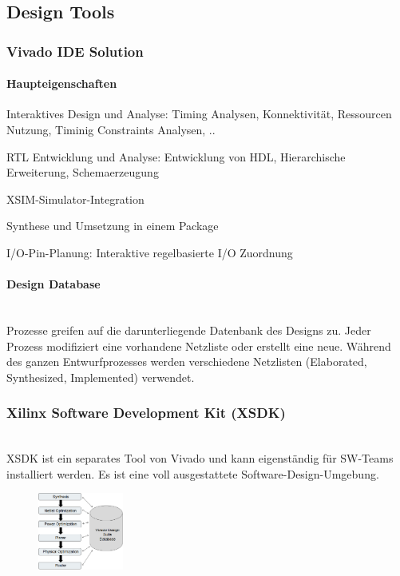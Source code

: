  \subsection{Design Tools}
 \subsubsection{Vivado IDE Solution}
 \paragraph{Haupteigenschaften}
 \begin{compactitem}
     \item Interaktives Design und Analyse: Timing Analysen, Konnektivität, Ressourcen Nutzung, Timinig Constraints Analysen, ..
     \item RTL Entwicklung und Analyse: Entwicklung von HDL, Hierarchische Erweiterung, Schemaerzeugung
     \item XSIM-Simulator-Integration
     \item Synthese und Umsetzung in einem Package
     \item I/O-Pin-Planung: Interaktive regelbasierte I/O Zuordnung
 \end{compactitem}
 \begin{multicols}{2}
     \paragraph{Design Database}$~$ \\
     Prozesse greifen auf die darunterliegende Datenbank des Designs zu. Jeder Prozess modifiziert eine vorhandene Netzliste oder erstellt eine neue. Während des ganzen Entwurfprozesses werden verschiedene Netzlisten (Elaborated, Synthesized, Implemented) verwendet.
     \subsubsection{Xilinx Software Development Kit (XSDK)}$~$ \\
    XSDK ist ein separates Tool von Vivado und kann eigenständig für SW-Teams installiert werden. Es ist eine voll ausgestattete Software-Design-Umgebung.
     \begin{figure}[H]
     	\includegraphics[width=0.25\textwidth]{images/Design_Database.png}
     \end{figure}
 \end{multicols}
